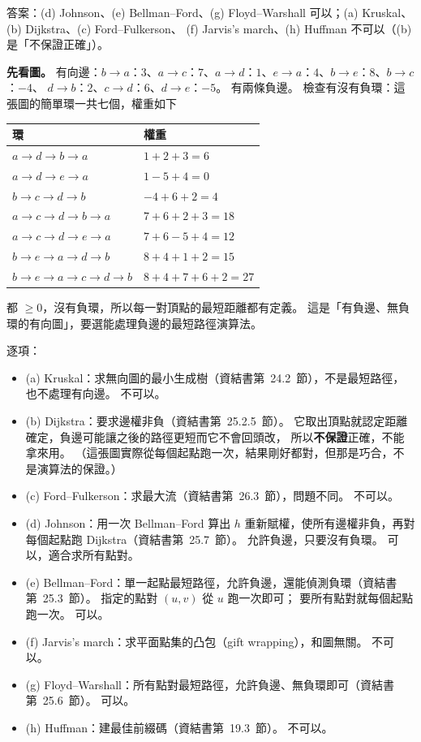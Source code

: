 \begin{pastsoln}
答案：(d) Johnson、(e) Bellman--Ford、(g) Floyd--Warshall 可以；(a) Kruskal、(b) Dijkstra、(c) Ford--Fulkerson、
(f) Jarvis's march、(h) Huffman 不可以（(b) 是「不保證正確」）。

\textbf{先看圖。} 有向邊：$b \to a$：$3$、$a \to c$：$7$、$a \to d$：$1$、$e \to a$：$4$、$b \to e$：$8$、$b \to c$：$-4$、
$d \to b$：$2$、$c \to d$：$6$、$d \to e$：$-5$。 有兩條負邊。 檢查有沒有負環：這張圖的簡單環一共七個，權重如下
\begin{center}
\begin{tabular}{ll}
\toprule
環 & 權重 \\
\midrule
$a \to d \to b \to a$ & $1 + 2 + 3 = 6$ \\
$a \to d \to e \to a$ & $1 - 5 + 4 = 0$ \\
$b \to c \to d \to b$ & $-4 + 6 + 2 = 4$ \\
$a \to c \to d \to b \to a$ & $7 + 6 + 2 + 3 = 18$ \\
$a \to c \to d \to e \to a$ & $7 + 6 - 5 + 4 = 12$ \\
$b \to e \to a \to d \to b$ & $8 + 4 + 1 + 2 = 15$ \\
$b \to e \to a \to c \to d \to b$ & $8 + 4 + 7 + 6 + 2 = 27$ \\
\bottomrule
\end{tabular}
\end{center}
都 $\ge 0$，沒有負環，所以每一對頂點的最短距離都有定義。 這是「有負邊、無負環的有向圖」，要選能處理負邊的最短路徑演算法。

逐項：
\begin{itemize}
\item (a) Kruskal：求無向圖的最小生成樹（資結書第~24.2~節），不是最短路徑，也不處理有向邊。 不可以。
\item (b) Dijkstra：要求邊權非負（資結書第~25.2.5~節）。 它取出頂點就認定距離確定，負邊可能讓之後的路徑更短而它不會回頭改，
所以\textbf{不保證}正確，不能拿來用。 （這張圖實際從每個起點跑一次，結果剛好都對，但那是巧合，不是演算法的保證。）
\item (c) Ford--Fulkerson：求最大流（資結書第~26.3~節），問題不同。 不可以。
\item (d) Johnson：用一次 Bellman--Ford 算出 $h$ 重新賦權，使所有邊權非負，再對每個起點跑 Dijkstra（資結書第~25.7~節）。
允許負邊，只要沒有負環。 可以，適合求所有點對。
\item (e) Bellman--Ford：單一起點最短路徑，允許負邊，還能偵測負環（資結書第~25.3~節）。 指定的點對 $(u, v)$ 從 $u$ 跑一次即可；
要所有點對就每個起點跑一次。 可以。
\item (f) Jarvis's march：求平面點集的凸包（gift wrapping），和圖無關。 不可以。
\item (g) Floyd--Warshall：所有點對最短路徑，允許負邊、無負環即可（資結書第~25.6~節）。 可以。
\item (h) Huffman：建最佳前綴碼（資結書第~19.3~節）。 不可以。
\end{itemize}


\end{pastsoln}

